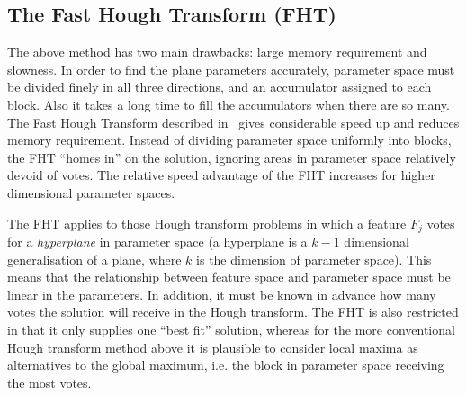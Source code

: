
\subsection{The Fast Hough Transform (FHT)}
\label{FHT_section}
The above method has two main drawbacks: large memory requirement and
slowness. In order to find the plane parameters accurately, parameter space
must be divided finely in all three directions, and an accumulator assigned
to each block. Also it takes a long time to fill the accumulators when
there are so many. The Fast Hough Transform described in~\cite{Li_etc_86}
gives considerable speed up and reduces memory
requirement. Instead of dividing parameter space uniformly into blocks,
the FHT ``homes in'' on the solution, ignoring areas in parameter space
relatively devoid of votes. The relative speed advantage of the FHT
increases for higher dimensional parameter spaces.

The FHT applies to those Hough transform problems in which a feature
$F_j$ votes for a {\em hyperplane} in parameter space (a hyperplane is
a $k-1$ dimensional generalisation of a plane, where $k$ is the dimension
of parameter space). This means that the relationship between feature space
and parameter space must be linear in the parameters.
In addition, it must be known in
advance how many votes the solution will receive in the Hough
transform.
The FHT is also restricted in that it only supplies one
``best fit'' solution, whereas for the more conventional Hough transform
method above it is plausible to consider local maxima as alternatives to
the global maximum, i.e. the block in parameter space
receiving the most votes.

